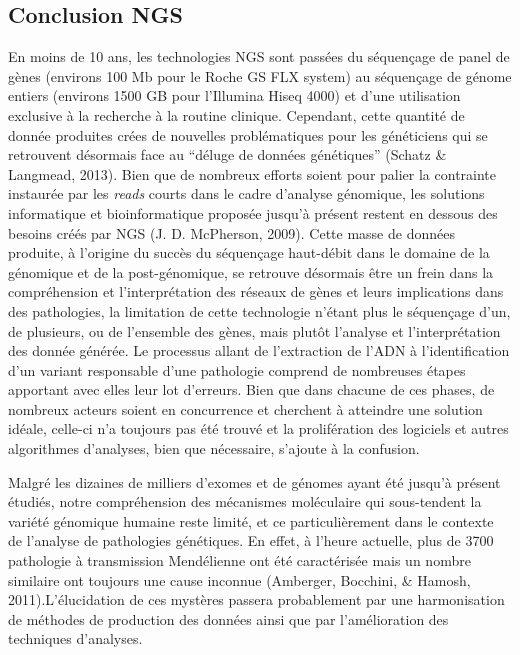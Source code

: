 \documentclass[12pt,twoside]{reedthesis}
\theoremstyle{definition}
\theoremstyle{definition}
\theoremstyle{remark}
\begin{document}
  \subsection{Conclusion NGS}\label{conclusion-ngs}
  
  En moins de 10 ans, les technologies NGS sont passées du séquençage de
  panel de gènes (environs 100 Mb pour le Roche GS FLX system) au
  séquençage de génome entiers (environs 1500 GB pour l'Illumina Hiseq
  4000) et d'une utilisation exclusive à la recherche à la routine
  clinique. Cependant, cette quantité de donnée produites crées de
  nouvelles problématiques pour les généticiens qui se retrouvent
  désormais face au ``déluge de données génétiques'' (Schatz \& Langmead,
  2013). Bien que de nombreux efforts soient pour palier la contrainte
  instaurée par les \emph{reads} courts dans le cadre d'analyse génomique,
  les solutions informatique et bioinformatique proposée jusqu'à présent
  restent en dessous des besoins créés par NGS (J. D. McPherson, 2009).
  Cette masse de données produite, à l'origine du succès du séquençage
  haut-débit dans le domaine de la génomique et de la post-génomique, se
  retrouve désormais être un frein dans la compréhension et
  l'interprétation des réseaux de gènes et leurs implications dans des
  pathologies, la limitation de cette technologie n'étant plus le
  séquençage d'un, de plusieurs, ou de l'ensemble des gènes, mais plutôt
  l'analyse et l'interprétation des donnée générée. Le processus allant de
  l'extraction de l'ADN à l'identification d'un variant responsable d'une
  pathologie comprend de nombreuses étapes apportant avec elles leur lot
  d'erreurs. Bien que dans chacune de ces phases, de nombreux acteurs
  soient en concurrence et cherchent à atteindre une solution idéale,
  celle-ci n'a toujours pas été trouvé et la prolifération des logiciels
  et autres algorithmes d'analyses, bien que nécessaire, s'ajoute à la
  confusion.
  
  Malgré les dizaines de milliers d'exomes et de génomes ayant été jusqu'à
  présent étudiés, notre compréhension des mécanismes moléculaire qui
  sous-tendent la variété génomique humaine reste limité, et ce
  particulièrement dans le contexte de l'analyse de pathologies
  génétiques. En effet, à l'heure actuelle, plus de 3700 pathologie à
  transmission Mendélienne ont été caractérisée mais un nombre similaire
  ont toujours une cause inconnue (Amberger, Bocchini, \& Hamosh,
  2011).L'élucidation de ces mystères passera probablement par une
  harmonisation de méthodes de production des données ainsi que par
  l'amélioration des techniques d'analyses.
  
\end{document}
